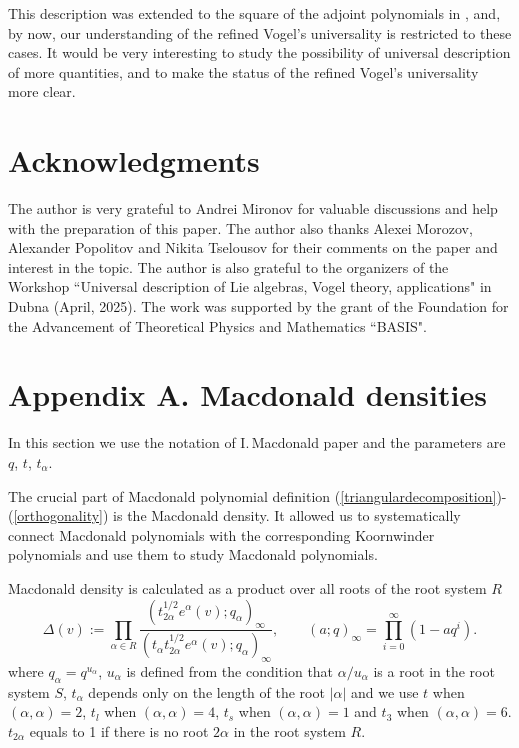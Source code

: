 \documentclass{article}
\begin{document}
This description was extended to the square of the adjoint polynomials in \cite{BMM}, and, by now, our understanding of the refined Vogel's universality is restricted to these cases. It would be very interesting to study the possibility of universal description of more quantities, and to make the status of the refined Vogel's universality more clear.

\section*{Acknowledgments}
The author is very grateful to Andrei Mironov for valuable discussions and help with the preparation of this paper. The author also thanks Alexei Morozov, Alexander Popolitov and Nikita Tselousov for their comments on the paper and interest in the topic. The author is also grateful to the organizers of the Workshop ``Universal description of Lie algebras, Vogel theory, applications" in Dubna (April, 2025).
The work was supported by the grant of the Foundation for the Advancement of Theoretical Physics and Mathematics ``BASIS".


\section*{Appendix A. Macdonald densities}

In this section we use the notation of I.\,Macdonald paper \cite{Mac} and the parameters are $q$, $t$, $t_{\alpha}$.


The crucial part of Macdonald polynomial definition (\ref{triangulardecomposition})-(\ref{orthogonality}) is the Macdonald density. It allowed us to systematically connect Macdonald polynomials with the corresponding Koornwinder polynomials and use them to study Macdonald polynomials.

Macdonald density is calculated as a product over all roots of the root system $R$
 \begin{equation}
     \Delta(v) := \prod_{\alpha \in R} \frac{\left(t_{2\alpha}^{1/2}e^{\alpha}(v);q_{\alpha}\right)_{\infty}}{\left(t_{\alpha}t_{2\alpha}^{1/2}e^{\alpha}(v);q_{\alpha}\right)_{\infty}}, \quad\quad (a;q)_{\infty} = \prod_{i=0}^{\infty} (1- aq^i).
\label{MacDens}
 \end{equation}
where $q_{\alpha} = q^{u_{\alpha}}$, $u_{\alpha}$ is defined from the condition that $\alpha/u_{\alpha}$ is a root in the root system $S$, $t_{\alpha}$ depends only on the length of the root $|\alpha|$ and we use $t$ when $(\alpha,\alpha)=2$, $t_l$ when $(\alpha,\alpha)=4$, $t_s$ when $(\alpha,\alpha)=1$ and $t_3$ when $(\alpha,\alpha)=6$. $t_{2\alpha}$ equals to 1 if there is no root $2\alpha$ in the root system $R$.
\end{document}
